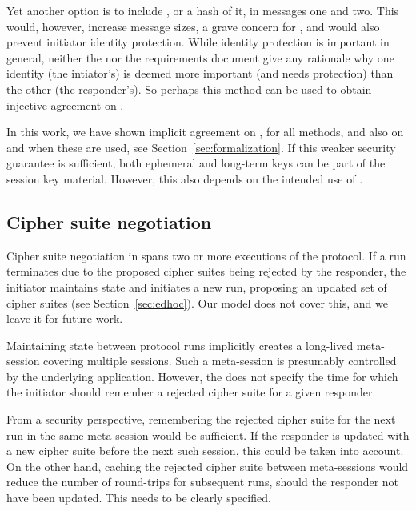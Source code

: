 \documentclass[runningheads,draft,x11names]{llncs}
\begin{document}
Yet another option is to include \mGi{}, or a hash of it, in messages one and two. This would, however, increase message sizes, a grave concern for \mEdhoc{}, and would also prevent initiator identity protection. While identity protection is important in general, neither the \mSpec{} nor the requirements document give any rationale why one identity (the intiator's) is deemed more important (and needs protection) than the other (the responder's). So perhaps this method can be used to obtain injective agreement on \mGiy. 

%
%
%
In this work, we have shown implicit agreement on \mGx{}, \mGy{} for all methods, and also on \mGiy{} and \mGrx{} when these are used, see Section~\ref{sec:formalization}. If this weaker security guarantee is sufficient, both ephemeral and long-term keys can be part of the session key material. However, this also depends on the intended use of \mEdhoc{}.
%

\subsection{Cipher suite negotiation}
\label{sec:ciphersuiteNegotiation}
%
Cipher suite negotiation in \mEdhoc{} spans two or more executions of the protocol. If a run terminates due to the proposed cipher suites being rejected by the responder, the initiator maintains state and initiates a new run, proposing an updated set of cipher suites (see Section~\ref{sec:edhoc}). Our model does not cover this, and we leave it for future work.

Maintaining state between protocol runs implicitly creates a long-lived meta-session covering multiple \mEdhoc{} sessions. Such a meta-session is presumably controlled by the underlying application. However, the \mSpec{} does not specify the time for which the initiator should remember a rejected cipher suite for a given responder.

%
From a security perspective, remembering the rejected cipher suite for the
next \mEdhoc{} run in the same meta-session would be sufficient. If the responder is updated with a new cipher suite before the next such session, this could be taken into account. On the other hand, caching the rejected cipher suite between meta-sessions would reduce the number of round-trips for subsequent runs, should the responder not have been updated. This needs to be clearly specified. 
\end{document}
